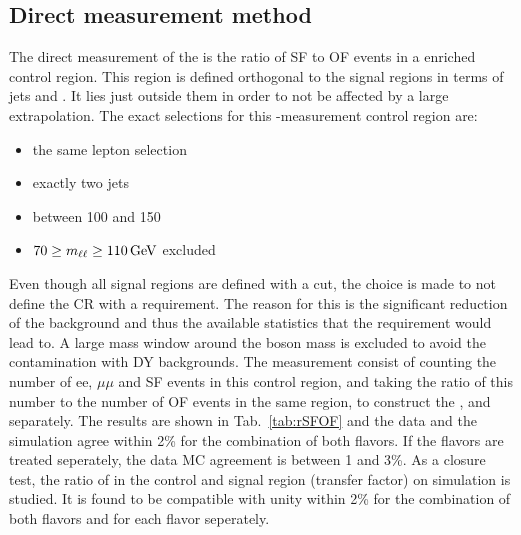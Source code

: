 \subsection*{Direct measurement method}\label{sec:rsfofDirect}
\noindent
\justify
The direct measurement of the \Rsfof is the ratio of SF to OF events in a \ttbar enriched control region. 
This region is defined orthogonal to the signal regions in terms of jets and \ptmiss. 
It lies just outside them in order to not be affected by a large extrapolation. 
The exact selections for this \Rsfof-measurement control region are:
\begin{itemize}
    \item the same lepton selection
    \item exactly two jets
    \item \ptmiss between 100 and 150\GeV
    \item $70\geq m_{\ell\ell}\geq110\,\text{Ge\hspace{-.08em}V}$ excluded
\end{itemize}                                 
Even though all signal regions are defined with a \mttwo cut, the choice is made to not define the \ttbar CR with a \mttwo requirement. 
The reason for this is the significant reduction of the \ttbar background and thus the available statistics that the \mttwo requirement would lead to.
A large mass window around the \PZ boson mass is excluded to avoid the contamination with DY backgrounds. 
The measurement consist of counting the number of ee, $\mu\mu$ and SF events in this control region, and taking the ratio of this number to the number of OF events in the same region, to construct the \Reeof, \Rmmof and \Rsfof separately. 
The results are shown in Tab.~\ref{tab:rSFOF} and the data and the simulation agree within 2\% for the combination of both flavors. 
If the flavors are treated seperately, the data MC agreement is between 1 and 3\%. 
As a closure test, the ratio of \Rsfof in the control and signal region (transfer factor) on simulation is studied. 
It is found to be compatible with unity within 2\%  for the combination of both flavors and for each flavor seperately.

